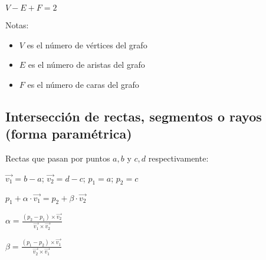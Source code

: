 \documentclass[10pt]{article}
\begin{document}
\begin{landscape}
$V - E + F = 2$

Notas:
\begin{itemize}
    \item $V$ es el número de vértices del grafo
    \item $E$ es el número de aristas del grafo
    \item $F$ es el número de caras del grafo
\end{itemize}

\subsection{Intersección de rectas, segmentos o rayos (forma paramétrica)}

Rectas que pasan por puntos $a, b$ y $c, d$ respectivamente:

$\displaystyle \vec{v_1} = b - a$; $\displaystyle \vec{v_2} = d - c$; $\displaystyle p_1 = a$; $\displaystyle p_2 = c$

$\displaystyle p_1 + \alpha \cdot \vec{v_1} = p_2 + \beta \cdot \vec{v_2}$

$\displaystyle \alpha = \frac{ \left( p_2 - p_1 \right) \times \vec{v_2} } { \vec{v_1} \times \vec{v_2} }$

$\displaystyle \beta = \frac{ \left( p_1 - p_2 \right) \times \vec{v_1} }{ \vec{v_2} \times \vec{v_1} }$

\end{landscape}
\end{document}
